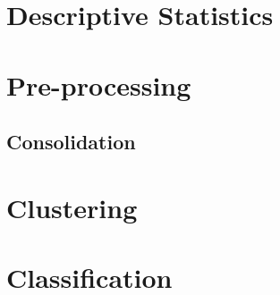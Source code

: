 \documentclass[../thesis.tex]{subfiles}
\begin{document}


\section{Descriptive Statistics}
\label{sec:app_desc_stat}



\section{Pre-processing}
\label{sec:pre_proc}



\subsection{Consolidation}
\label{sec:consolidation}



\section{Clustering}
\label{sec:clust}



\section{Classification}
\label{sec:classifi}


\end{document}
